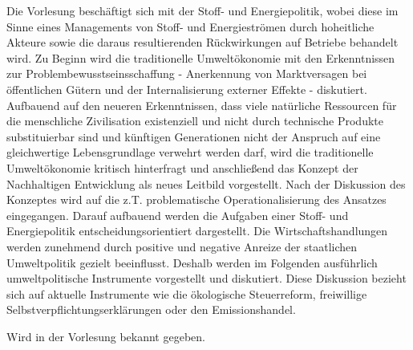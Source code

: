 \begin{course}
\begin{content}
Die Vorlesung beschäftigt sich mit der Stoff- und Energiepolitik, wobei diese im Sinne eines Managements von Stoff- und Energieströmen durch hoheitliche Akteure sowie die daraus resultierenden Rückwirkungen auf Betriebe behandelt wird. Zu Beginn wird die traditionelle Umweltökonomie mit den Erkenntnissen zur Problembewusstseinsschaffung - Anerkennung von Marktversagen bei öffentlichen Gütern und der Internalisierung externer Effekte - diskutiert. Aufbauend auf den neueren Erkenntnissen, dass viele natürliche Ressourcen für die menschliche Zivilisation existenziell und nicht durch technische Produkte substituierbar sind und künftigen Generationen nicht der Anspruch auf eine gleichwertige Lebensgrundlage verwehrt werden darf, wird die traditionelle Umweltökonomie kritisch hinterfragt und anschließend das Konzept der Nachhaltigen Entwicklung als neues Leitbild vorgestellt. Nach der Diskussion des Konzeptes wird auf die z.T. problematische Operationalisierung des Ansatzes eingegangen. Darauf aufbauend werden die Aufgaben einer Stoff- und Energiepolitik entscheidungsorientiert dargestellt. Die Wirtschaftshandlungen werden zunehmend durch positive und negative Anreize der staatlichen Umweltpolitik gezielt beeinflusst. Deshalb werden im Folgenden ausführlich umweltpolitische Instrumente vorgestellt und diskutiert. Diese Diskussion bezieht sich auf aktuelle Instrumente wie die ökologische Steuerreform, freiwillige Selbstverpflichtungserklärungen oder den Emissionshandel.


\end{content}



\begin{literature}Wird in der Vorlesung bekannt gegeben.

\end{literature}



\end{course}